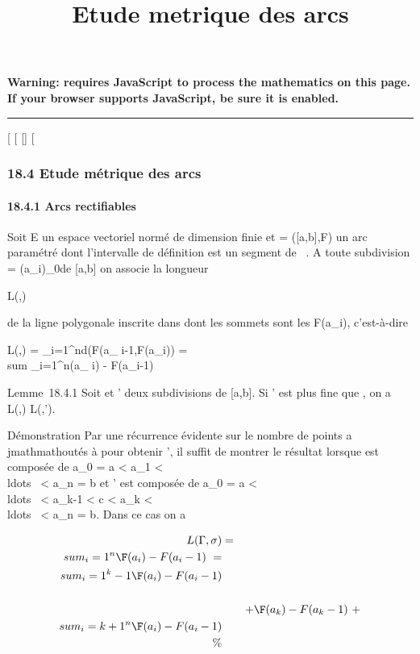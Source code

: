 \documentclass[]{article}
\title{Etude metrique des arcs}
\author{}
\date{}
\begin{document}
\maketitle

\textbf{Warning: 
requires JavaScript to process the mathematics on this page.\\ If your
browser supports JavaScript, be sure it is enabled.}

\begin{center}\rule{3in}{0.4pt}\end{center}

{[}
{[}
{[}{]}
{[}

\subsubsection{18.4 Etude métrique des arcs}

\paragraph{18.4.1 Arcs rectifiables}

Soit E un espace vectoriel normé de dimension finie et \Gamma = ({[}a,b{]},F)
un arc paramétré dont l'intervalle de définition est un segment de ~. A
toute subdivision \sigma = (a_i)_0\leqi\leqn de {[}a,b{]} on
associe la longueur

L(\Gamma,\sigma)

de la ligne polygonale inscrite dans \Gamma dont les sommets sont les
F(a_i), c'est-à-dire

L(\Gamma,\sigma) = \sum _i=1^nd(F(a_
i-1,F(a_i)) = \\sum
_i=1^n\F(a_ i) -
F(a_i-1)\

Lemme~18.4.1 Soit \sigma et \sigma' deux subdivisions de {[}a,b{]}. Si \sigma' est plus
fine que \sigma, on a L(\Gamma,\sigma) \leq L(\Gamma,\sigma').

Démonstration Par une récurrence évidente sur le nombre de points
a\\jmathmathoutés à \sigma pour obtenir \sigma', il suffit de montrer le résultat lorsque \sigma
est composée de a_0 = a \textless{} a_1 \textless{}
\\ldots~ \textless{}
a_n = b et \sigma' est composée de a_0 = a \textless{}
\\ldots~ \textless{}
a_k-1 \textless{} c \textless{} a_k \textless{}
\\ldots~ \textless{}
a_n = b. Dans ce cas on a

\begin{align*} L(\Gamma,\sigma)& =&
\\sum
_i=1^n\F(a_ i) -
F(a_i-1)\ =
\\sum
_i=1^k-1\F(a_ i) -
F(a_i-1)\\%
\\ & &
+\F(a_k) -
F(a_k-1)\ +
\\sum
_i=k+1^n\F(a_ i) -
F(a_i-1)\\ \%&
\\ \end{align*}
\end{document}

